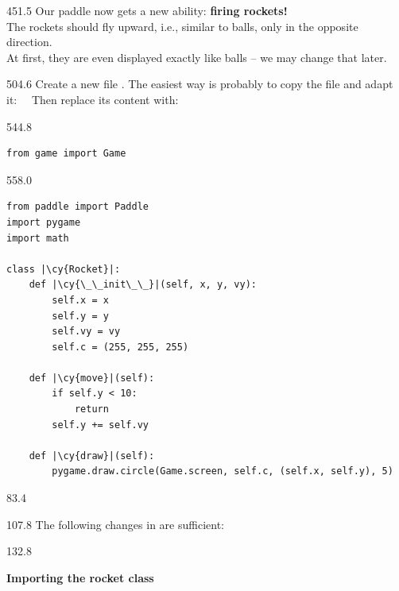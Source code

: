 \documentclass{aslab}
\newcommand*\cy[1]{\textcolor{codecyan}{#1}}
\begin{document}
\begin{region}[pitch=13.25]{451.5}
Our paddle now gets a new ability: \textbf{firing rockets!}\\
The rockets should fly upward, i.e., similar to balls, only in the opposite
direction.\\
At first, they are even displayed exactly like balls -- we may change that
later.
\end{region}

\begin{region}[pitch=13.5]{504.6}
Create a new file . The easiest way is probably to copy the
file  and adapt it: \ \ Then replace
its content with:
\end{region}

\begin{region}{544.8}
\begin{lstlisting}[style=py]
from game import Game
\end{lstlisting}
\end{region}

\begin{region}{558.0}
\begin{lstlisting}[style=py]
from paddle import Paddle
import pygame
import math

class |\cy{Rocket}|:
    def |\cy{\_\_init\_\_}|(self, x, y, vy):
        self.x = x
        self.y = y
        self.vy = vy
        self.c = (255, 255, 255)

    def |\cy{move}|(self):
        if self.y < 10:
            return
        self.y += self.vy

    def |\cy{draw}|(self):
        pygame.draw.circle(Game.screen, self.c, (self.x, self.y), 5)
\end{lstlisting}
\end{region}

\nextpage
\begin{region}{83.4}
\end{region}

\begin{region}{107.8}
The following changes in  are sufficient:
\end{region}

\begin{region}{132.8}
\begin{ntasks}
\item \textbf{Importing the rocket class}
\end{ntasks}
\end{region}
\end{document}
